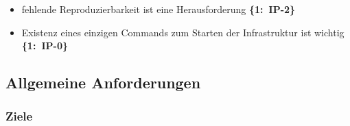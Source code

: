 \begin{flushleft}
    \begin{itemize}
        \item fehlende Reproduzierbarkeit ist eine Herausforderung \mbox{\textbf{\{1: IP-2\}}}
        \item Existenz eines einzigen Commands \linebreak[1] zum Starten der Infrastruktur ist wichtig \mbox{\textbf{\{1: IP-0\}}}
    \end{itemize}
\end{flushleft}

\subsection{Allgemeine Anforderungen}
\label{subsec:AA-04-04_requirements-general}

\subsubsection{Ziele}
\label{subsubsec:AA-04-04-01_req-gen-goals}

